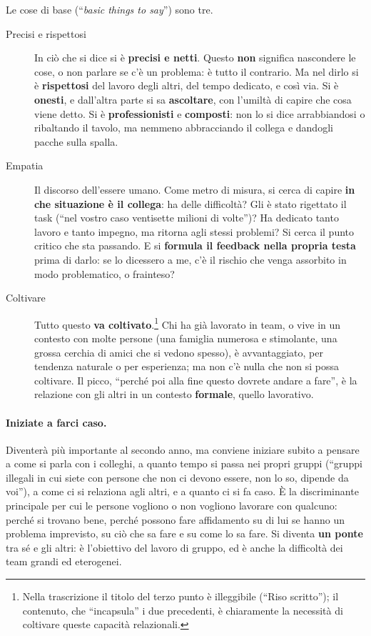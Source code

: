 Le cose di base (``\emph{basic things to say}'') sono tre.
\begin{description}
  \item[Precisi e rispettosi] In ciò che si dice si è \textbf{precisi e
        netti}. Questo \textbf{non} significa nascondere le cose, o non
        parlare se c'è un problema: è tutto il contrario. Ma nel dirlo si
        è \textbf{rispettosi} del lavoro degli altri, del tempo dedicato, e
        così via. Si è \textbf{onesti}, e dall'altra parte si sa
        \textbf{ascoltare}, con l'umiltà di capire che cosa viene detto. Si è
        \textbf{professionisti} e \textbf{composti}: non lo si dice
        arrabbiandosi o ribaltando il tavolo, ma nemmeno abbracciando il
        collega e dandogli pacche sulla spalla.
  \item[Empatia] Il discorso dell'essere umano. Come metro di misura, si
        cerca di capire \textbf{in che situazione è il collega}: ha delle
        difficoltà? Gli è stato rigettato il task (``nel vostro caso
        ventisette milioni di volte'')? Ha dedicato tanto lavoro e tanto
        impegno, ma ritorna agli stessi problemi? Si cerca il punto critico
        che sta passando. E si \textbf{formula il feedback nella propria
        testa} prima di darlo: se lo dicessero a me, c'è il rischio che
        venga assorbito in modo problematico, o frainteso?
  \item[Coltivare] Tutto questo \textbf{va coltivato}.\footnote{Nella
        trascrizione il titolo del terzo punto è illeggibile (``Riso
        scritto''); il contenuto, che ``incapsula'' i due precedenti, è
        chiaramente la necessità di coltivare queste capacità
        relazionali.} Chi ha già lavorato in team, o vive in un contesto
        con molte persone (una famiglia numerosa e stimolante, una grossa
        cerchia di amici che si vedono spesso), è avvantaggiato, per
        tendenza naturale o per esperienza; ma non c'è nulla che non si
        possa coltivare. Il picco, ``perché poi alla fine questo dovrete
        andare a fare'', è la relazione con gli altri in un contesto
        \textbf{formale}, quello lavorativo.
\end{description}

\paragraph{Iniziate a farci caso.} Diventerà più importante al secondo
anno, ma conviene iniziare subito a pensare a come si parla con i colleghi,
a quanto tempo si passa nei propri gruppi (``gruppi illegali in cui siete
con persone che non ci devono essere, non lo so, dipende da voi''), a come
ci si relaziona agli altri, e a quanto ci si fa caso. È la discriminante
principale per cui le persone vogliono o non vogliono lavorare con qualcuno:
perché si trovano bene, perché possono fare affidamento su di lui se hanno
un problema imprevisto, su ciò che sa fare e su come lo sa fare. Si diventa
\textbf{un ponte} tra sé e gli altri: è l'obiettivo del lavoro di gruppo, ed
è anche la difficoltà dei team grandi ed eterogenei.


